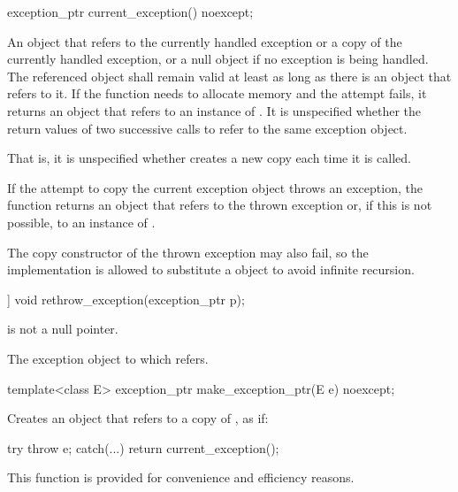 %
\begin{itemdecl}
exception_ptr current_exception() noexcept;
\end{itemdecl}

\begin{itemdescr}
\pnum
\returns An  object that refers to
the currently handled exception or a copy of the currently
handled exception, or a null  object if no exception is being
handled. The referenced object shall remain valid at least as long as there is an
 object that refers to it.
If the function needs to allocate memory and the attempt fails, it returns an
 object that refers to an instance of .
It is unspecified whether the return values of two successive calls to
 refer to the same exception object.
\begin{note} That is, it is unspecified whether 
creates a new copy each time it is called. \end{note}
If the attempt to copy the current exception object throws an exception, the function
returns an  object that refers to the thrown exception or,
if this is not possible, to an instance of . \begin{note} The
copy constructor of the thrown exception may also fail, so the implementation is allowed
to substitute a  object to avoid infinite
recursion.\end{note}
\end{itemdescr}

%
\begin{itemdecl}
[[noreturn]] void rethrow_exception(exception_ptr p);
\end{itemdecl}

\begin{itemdescr}
\pnum
\expects {} is not a null pointer.

\pnum
\throws The exception object to which  refers.
\end{itemdescr}

%
\begin{itemdecl}
template<class E> exception_ptr make_exception_ptr(E e) noexcept;
\end{itemdecl}

\begin{itemdescr}
\pnum
\effects Creates an  object that refers to a copy of , as if:
\begin{codeblock}
try {
  throw e;
} catch(...) {
  return current_exception();
}
\end{codeblock}

\pnum
\begin{note} This function is provided for convenience and
efficiency reasons. \end{note}
\end{itemdescr}

